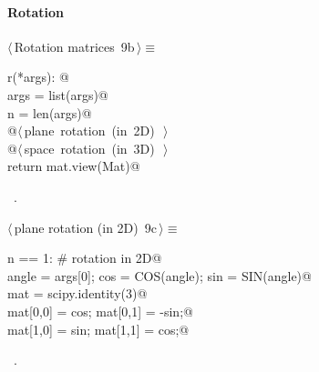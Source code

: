 \documentclass[11pt,oneside]{article}	%
\begin{document}
\paragraph{Rotation}
\begin{flushleft} \small \label{scrap19}
\protect{}$\langle\,$Rotation matrices\nobreak\ {\footnotesize 9b}$\,\rangle\equiv$
\vspace{-1ex}
\begin{list}{}{} \item
\mbox{}\verb@def r(*args): @\\
\mbox{}\verb@   args = list(args)@\\
\mbox{}\verb@   n = len(args)@\\
\mbox{}\verb@   @\hbox{$\langle\,$plane rotation (in 2D)\nobreak\ {\footnotesize {}}$\,\rangle$}\verb@@\\
\mbox{}\verb@   @\hbox{$\langle\,$space rotation (in 3D)\nobreak\ {\footnotesize {}}$\,\rangle$}\verb@@\\
\mbox{}\verb@   return mat.view(Mat)@\\
\mbox{}\verb@@{\NWsep}
\end{list}
\vspace{-1ex}
\footnotesize\addtolength{\baselineskip}{-1ex}
\begin{list}{}{\setlength{\itemsep}{-\parsep}\setlength{\itemindent}{-\leftmargin}}
\item \NWtxtMacroRefIn\ .
\end{list}
\end{flushleft}
\begin{flushleft} \small \label{scrap20}
\protect{}$\langle\,$plane rotation (in 2D)\nobreak\ {\footnotesize 9c}$\,\rangle\equiv$
\vspace{-1ex}
\begin{list}{}{} \item
\mbox{}\verb@if n == 1: # rotation in 2D@\\
\mbox{}\verb@   angle = args[0]; cos = COS(angle); sin = SIN(angle)@\\
\mbox{}\verb@   mat = scipy.identity(3)@\\
\mbox{}\verb@   mat[0,0] = cos;   mat[0,1] = -sin;@\\
\mbox{}\verb@   mat[1,0] = sin;   mat[1,1] = cos;@\\
\mbox{}\verb@@{\NWsep}
\end{list}
\vspace{-1ex}
\footnotesize\addtolength{\baselineskip}{-1ex}
\begin{list}{}{\setlength{\itemsep}{-\parsep}\setlength{\itemindent}{-\leftmargin}}
\item \NWtxtMacroRefIn\ .
\end{list}
\end{flushleft}
\end{document}
